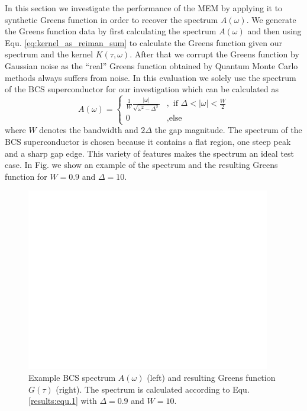 In this section we investigate the performance of the MEM by applying it to synthetic Greens function in order to recover the spectrum $A(\omega)$. We generate the Greens function data by first calculating the spectrum $A(\omega)$ and then using Equ. \ref{eq:kernel_as_reiman_sum} to calculate the Greens function given our spectrum and the kernel $K(\tau,\omega)$. After that we corrupt the Greens function by Gaussian noise as the ``real'' Greens function obtained by Quantum Monte Carlo methods always suffers from noise. In this evaluation we solely use the spectrum of the BCS superconductor for our investigation which can be calculated as
\begin{equation}
	A(\omega) = 
		\begin{cases}
			\frac{1}{W} \frac{|\omega|}{\sqrt{\omega^2 - \Delta^2}}&, \text{ if } \Delta < |\omega| < \frac{W}{2} \\
			0 &, \text{else}
		\end{cases}
	\label{results:equ.1}
\end{equation}
where $W$ denotes the bandwidth and $2\Delta$ the gap magnitude. The spectrum of the BCS superconductor is chosen because it contains a flat region, one steep peak and a sharp gap edge. This variety of features makes the spectrum an ideal test case.
In Fig. we show an example of the spectrum and the resulting Greens function for $W = 0.9$ and $\Delta = 10$.
\begin{figure}[htbp]
	\centering
	\includegraphics[width=0.95\textwidth]{./images/BCS_A_G_example.pdf}
	\caption{Example BCS spectrum $A(\omega)$ (left) and resulting Greens function $G(\tau)$ (right). The spectrum is calculated according to Equ. \ref{results:equ.1} with $\Delta = 0.9$ and $W = 10$.}
	\label{results:fig.1}
\end{figure}
